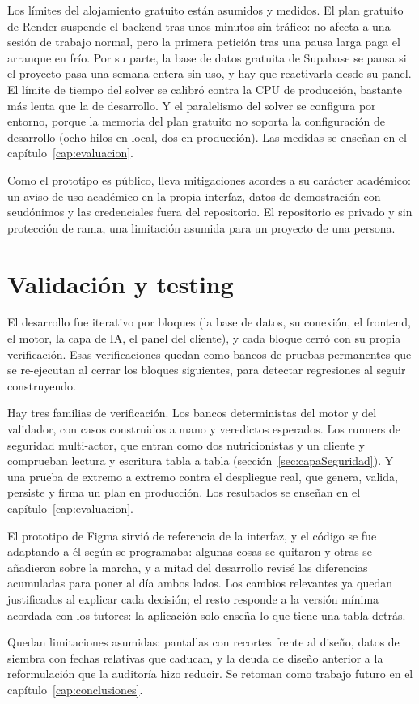 Los límites del alojamiento gratuito están asumidos y medidos. El plan gratuito de Render suspende el backend tras unos minutos sin tráfico: no afecta a una sesión de trabajo normal, pero la primera petición tras una pausa larga paga el arranque en frío. Por su parte, la base de datos gratuita de Supabase se pausa si el proyecto pasa una semana entera sin uso, y hay que reactivarla desde su panel. El límite de tiempo del solver se calibró contra la CPU de producción, bastante más lenta que la de desarrollo. Y el paralelismo del solver se configura por entorno, porque la memoria del plan gratuito no soporta la configuración de desarrollo (ocho hilos en local, dos en producción). Las medidas se enseñan en el capítulo~\ref{cap:evaluacion}.

Como el prototipo es público, lleva mitigaciones acordes a su carácter académico: un aviso de uso académico en la propia interfaz, datos de demostración con seudónimos y las credenciales fuera del repositorio. El repositorio es privado y sin protección de rama, una limitación asumida para un proyecto de una persona.

\section{Validación y testing}
\label{sec:validacionTesting}

El desarrollo fue iterativo por bloques (la base de datos, su conexión, el frontend, el motor, la capa de IA, el panel del cliente), y cada bloque cerró con su propia verificación. Esas verificaciones quedan como bancos de pruebas permanentes que se re-ejecutan al cerrar los bloques siguientes, para detectar regresiones al seguir construyendo.

Hay tres familias de verificación. Los bancos deterministas del motor y del validador, con casos construidos a mano y veredictos esperados. Los runners de seguridad multi-actor, que entran como dos nutricionistas y un cliente y comprueban lectura y escritura tabla a tabla (sección~\ref{sec:capaSeguridad}). Y una prueba de extremo a extremo contra el despliegue real, que genera, valida, persiste y firma un plan en producción. Los resultados se enseñan en el capítulo~\ref{cap:evaluacion}.

El prototipo de Figma sirvió de referencia de la interfaz, y el código se fue adaptando a él según se programaba: algunas cosas se quitaron y otras se añadieron sobre la marcha, y a mitad del desarrollo revisé las diferencias acumuladas para poner al día ambos lados. Los cambios relevantes ya quedan justificados al explicar cada decisión; el resto responde a la versión mínima acordada con los tutores: la aplicación solo enseña lo que tiene una tabla detrás.

Quedan limitaciones asumidas: pantallas con recortes frente al diseño, datos de siembra con fechas relativas que caducan, y la deuda de diseño anterior a la reformulación que la auditoría hizo reducir. Se retoman como trabajo futuro en el capítulo~\ref{cap:conclusiones}.
